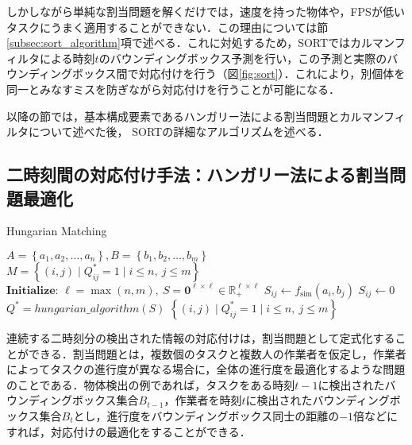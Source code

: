     しかしながら単純な割当問題を解くだけでは，速度を持った物体や，FPSが低いタスクにうまく適用することができない．この理由については節\ref{subsec:sort_algorithm}項で述べる．これに対処するため，SORTではカルマンフィルタによる時刻$t$のバウンディングボックス予測を行い，この予測と実際のバウンディングボックス間で対応付けを行う（図\ref{fig:sort}）．これにより，別個体を同一とみなすミスを防ぎながら対応付けを行うことが可能になる．

    以降の節では，基本構成要素であるハンガリー法による割当問題とカルマンフィルタについて述べた後， SORTの詳細なアルゴリズムを述べる．

    \subsection{二時刻間の対応付け手法：ハンガリー法による割当問題最適化}
    \label{subsec:hungarian_algorithm}

    \begin{algorithm}[t]
        \caption{Hungarian Matching}
        \label{alg:hungarian_matching}
        \begin{algorithmic}[1]
            \Require $A = \left\{a_1, a_2, \dots, a_n\right\}, B = \left\{b_1, b_2, \dots, b_m\right\}$
            \Ensure $M = \left\{(i, j) \mid Q^*_{ij} = 1 \mid i \leq n , ~ j \leq m\right\}$
            \State $\textbf{Initialize: } \ell = \max(n, m), ~ S = \bm{0}^{\ell \times \ell} \in \mathbb{R}_+^{\ell \times \ell}$
                        \State $S_{ij} \gets f_{\text{sim}}(a_i, b_j)$
                    \Else
                        \State $S_{ij} \gets 0$
                    \EndIf
                \EndFor
            \EndFor
            \State $Q^* = hungarian\_algorithm(S)$
            \State \Return $\left\{(i, j) \mid Q^*_{ij} = 1 \mid i \leq n , ~ j \leq m\right\}$
        \end{algorithmic}
    \end{algorithm}

    連続する二時刻分の検出された情報の対応付けは，割当問題として定式化することができる．割当問題とは，複数個のタスクと複数人の作業者を仮定し，作業者によってタスクの進行度が異なる場合に，全体の進行度を最適化するような問題のことである．物体検出の例であれば，タスクをある時刻$t-1$に検出されたバウンディングボックス集合$B_{t-1}$，作業者を時刻$t$に検出されたバウンディングボックス集合$B_{t}$とし，進行度をバウンディングボックス同士の距離の$-1$倍などにすれば，対応付けの最適化をすることができる．

